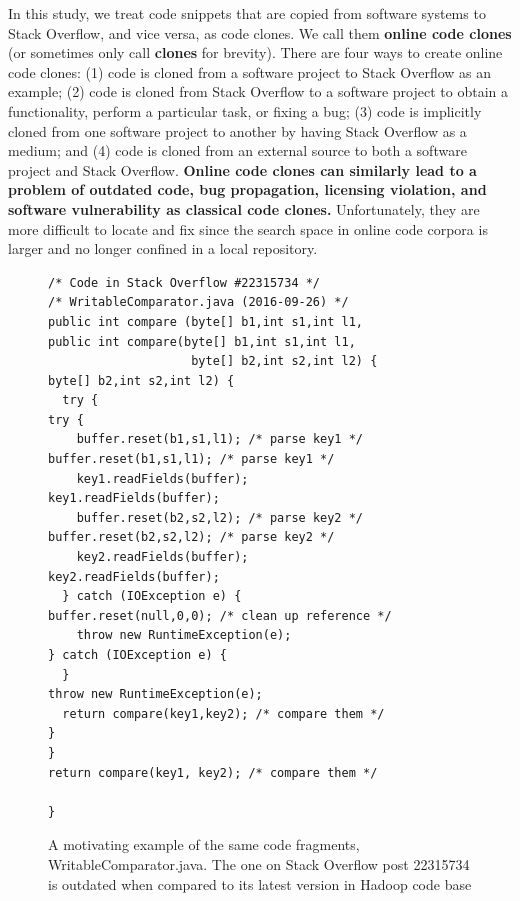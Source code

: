 \documentclass{sig-alternate-05-2015}
\begin{document}

In this study, we treat code snippets that are copied from software systems to Stack Overflow, and vice versa, as code clones. We call them \textbf{online code clones} (or sometimes only call \textbf{clones} for brevity). There are four ways to create online code clones: (1) code is cloned from a software project to Stack Overflow as an example; (2) code is cloned from Stack Overflow to a software project to obtain a functionality, perform a particular task, or fixing a bug; (3) code is implicitly cloned from one software project to another by having Stack Overflow as a medium; and (4) code is cloned from an external source to both a software project and Stack Overflow. \textbf{Online code clones can similarly lead to a problem of outdated code, bug propagation, licensing violation, and software vulnerability as classical code clones.} Unfortunately, they are more difficult to locate and fix since the search space in online code corpora is larger and no longer confined in a local repository.

\begin{figure}
	\begin{lstlisting}
/* Code in Stack Overflow #22315734 */                    /* WritableComparator.java (2016-09-26) */
public int compare (byte[] b1,int s1,int l1,              public int compare(byte[] b1,int s1,int l1,
                    byte[] b2,int s2,int l2) {                               byte[] b2,int s2,int l2) {
  try {                                                     try {
    buffer.reset(b1,s1,l1); /* parse key1 */                  buffer.reset(b1,s1,l1); /* parse key1 */
    key1.readFields(buffer);                                  key1.readFields(buffer);
    buffer.reset(b2,s2,l2); /* parse key2 */                  buffer.reset(b2,s2,l2); /* parse key2 */
    key2.readFields(buffer);                                  key2.readFields(buffer);
  } catch (IOException e) {                                   buffer.reset(null,0,0); /* clean up reference */
    throw new RuntimeException(e);                          } catch (IOException e) {
  }                                                           throw new RuntimeException(e);
  return compare(key1,key2); /* compare them */             }
}                                                           return compare(key1, key2); /* compare them */
	                                                        }
	\end{lstlisting}
	\caption{A motivating example of the same code fragments, WritableComparator.java. The one on Stack Overflow post 22315734 is outdated when compared to its latest version in Hadoop code base}
	\label{fig:before-after}
\end{figure}
\end{document}
